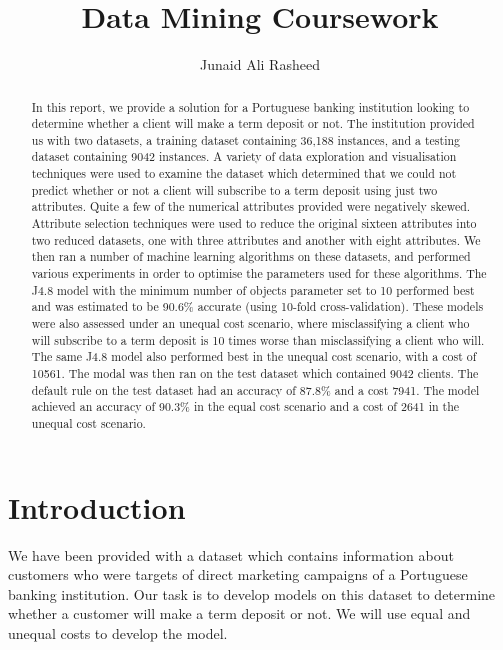 \documentclass[a4paper,11pt]{article}
\title{Data Mining Coursework}
\author{Junaid Ali Rasheed}
\begin{document}
\maketitle

\begin{abstract}

\noindent In this report, we provide a solution for a Portuguese banking institution looking to determine whether
a client will make a term deposit or not. The institution provided us with two datasets, a training
dataset containing 36,188 instances, and a testing dataset containing 9042 instances. A variety
of data exploration and visualisation techniques were used to examine the dataset which determined
that we could not predict whether or not a client will subscribe to a term deposit using just two
attributes. Quite a few of the numerical attributes provided were negatively skewed. Attribute
selection techniques were used to reduce the original sixteen attributes into two reduced datasets,
one with three attributes and another with eight attributes. We then ran a number of machine learning
algorithms on these datasets, and performed various experiments in order to optimise the parameters used
for these algorithms. The J4.8 model with the minimum number of objects parameter set to 10 performed best
and was estimated to be 90.6\% accurate (using 10-fold cross-validation). These models were also assessed
under an unequal cost scenario, where misclassifying a client who will subscribe to a term deposit is 10
times worse than misclassifying a client who will. The same J4.8 model also performed best in the unequal
cost scenario, with a cost of 10561. The modal was then ran on the test dataset which contained 9042
clients. The default rule on the test dataset had an accuracy of 87.8\% and a cost 7941. The model achieved
an accuracy of 90.3\% in the equal cost scenario and a cost of 2641 in the unequal cost scenario.

\end{abstract}

\section{Introduction}
We have been provided with a dataset which contains information about customers
who were targets of direct marketing campaigns of a Portuguese banking institution.
Our task is to develop models on this dataset to determine whether a customer
will make a term deposit or not. We will use equal and unequal costs to develop
the model.
\end{document}
